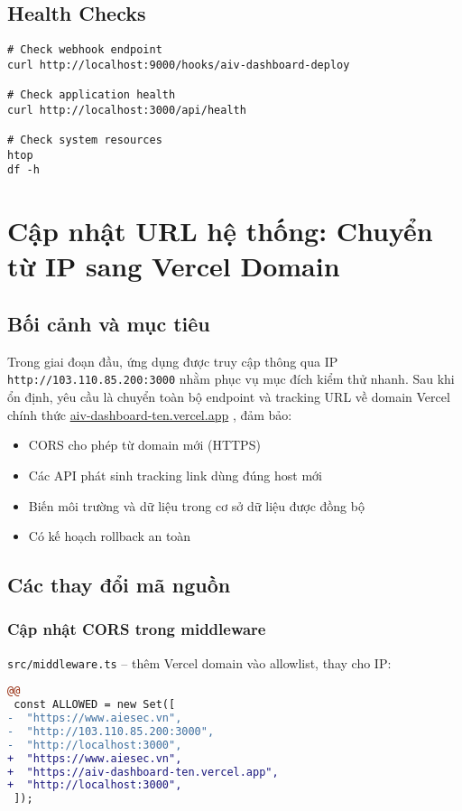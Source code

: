 \documentclass[12pt,a4paper]{article}
\begin{document}
\subsection{Health Checks}

\begin{lstlisting}[caption=Các lệnh health check]
# Check webhook endpoint
curl http://localhost:9000/hooks/aiv-dashboard-deploy

# Check application health
curl http://localhost:3000/api/health

# Check system resources
htop
df -h
\end{lstlisting}

\section{Cập nhật URL hệ thống: Chuyển từ IP sang Vercel Domain}

\subsection{Bối cảnh và mục tiêu}

Trong giai đoạn đầu, ứng dụng được truy cập thông qua IP \texttt{http://103.110.85.200:3000} nhằm phục vụ mục đích kiểm thử nhanh. Sau khi ổn định, yêu cầu là chuyển toàn bộ endpoint và tracking URL về domain Vercel chính thức \href{https://aiv-dashboard-ten.vercel.app}{aiv-dashboard-ten.vercel.app} \cite{vercel-app}, đảm bảo:
\begin{itemize}
  \item CORS cho phép từ domain mới (HTTPS)
  \item Các API phát sinh tracking link dùng đúng host mới
  \item Biến môi trường và dữ liệu trong cơ sở dữ liệu được đồng bộ
  \item Có kế hoạch rollback an toàn
\end{itemize}

\subsection{Các thay đổi mã nguồn}

\subsubsection{Cập nhật CORS trong middleware}
\texttt{src/middleware.ts} – thêm Vercel domain vào allowlist, thay cho IP:
\begin{lstlisting}[language=diff,caption=Update ALLOWED origins trong middleware.ts]
@@
 const ALLOWED = new Set([
-  "https://www.aiesec.vn",
-  "http://103.110.85.200:3000",
-  "http://localhost:3000",
+  "https://www.aiesec.vn",
+  "https://aiv-dashboard-ten.vercel.app",
+  "http://localhost:3000",
 ]);
\end{lstlisting}
\end{document}
